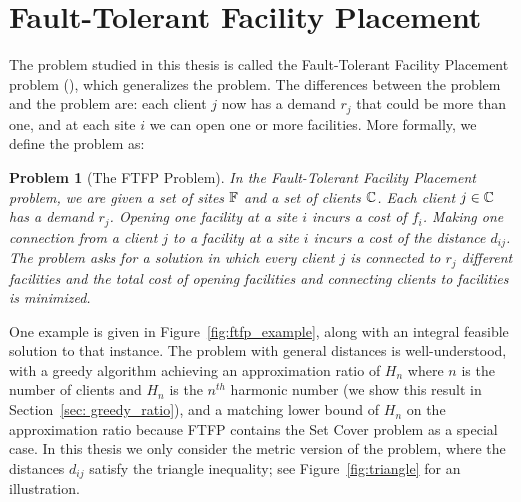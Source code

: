 \documentclass[oneside,final]{ucr}
\newtheorem{problem}[theorem]{Problem}
\def\ssp{\def\baselinestretch{1.0}\large\normalsize}
\begin{document}
\section{Fault-Tolerant Facility Placement}
The problem studied in this thesis is called the
Fault-Tolerant Facility Placement problem (\FTFP), which
generalizes the {\UFL} problem. The differences between the
{\UFL} problem and the {\FTFP} problem are: each client $j$
now has a demand $r_j$ that could be more than one, and at
each site $i$ we can open one or more facilities. More
formally, we define the {\FTFP} problem as:
\begin{problem}[The FTFP Problem]
  \label{problem:ftfp}
  In the Fault-Tolerant Facility Placement problem, we are
  given a set of sites $\mathbb{F}$ and a set of clients
  $\mathbb{C}$. Each client $j \in \mathbb{C}$ has a demand
  $r_j$. Opening one facility at a site $i$ incurs a cost of
  $f_i$. Making one connection from a client $j$ to a
  facility at a site $i$ incurs a cost of the distance
  $d_{ij}$. The problem asks for a solution in which every
  client $j$ is connected to $r_j$ different facilities and
  the total cost of opening facilities and connecting
  clients to facilities is minimized.
\end{problem}
One example is given in Figure~\ref{fig:ftfp_example}, along
with an integral feasible solution to that instance. The
{\FTFP} problem with general distances is well-understood,
with a greedy algorithm achieving an approximation ratio of
$H_n$ where $n$ is the number of clients and $H_n$ is the
$n^{th}$ harmonic number (we show this result in
Section~\ref{sec: greedy_ratio}), and a matching lower bound
of $H_n$ on the approximation ratio because FTFP contains
the Set Cover problem as a special case. In this thesis we
only consider the metric version of the {\FTFP} problem,
where the distances $d_{ij}$ satisfy the triangle
inequality; see Figure~\ref{fig:triangle} for an
illustration.
\ssp
\end{document}

